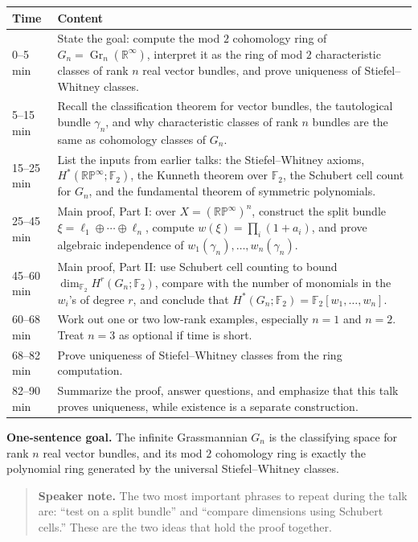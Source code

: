 \documentclass[11pt]{article}
\theoremstyle{remark}
\newcommand{\F}{\mathbb F}
\newcommand{\R}{\mathbb R}
\newcommand{\RP}{\mathbb{RP}}
\newcommand{\Gr}{\operatorname{Gr}}
\newcommand{\Gn}{G_n}
\newcommand{\gamman}{\gamma_n}
\newenvironment{talknote}{\begin{quote}\small\textbf{Speaker note.} }{\end{quote}}
\begin{document}
\begin{longtable}{@{}p{}p{}@{}}
\toprule
Time & Content \\
\midrule
0--5 min & State the goal: compute the mod $2$ cohomology ring of $\Gn=\Gr_n(\R^\infty)$, interpret it as the ring of mod $2$ characteristic classes of rank $n$ real vector bundles, and prove uniqueness of Stiefel--Whitney classes. \\
5--15 min & Recall the classification theorem for vector bundles, the tautological bundle $\gamman$, and why characteristic classes of rank $n$ bundles are the same as cohomology classes of $\Gn$. \\
15--25 min & List the inputs from earlier talks: the Stiefel--Whitney axioms, $H^*(\RP^\infty;\F_2)$, the Kunneth theorem over $\F_2$, the Schubert cell count for $\Gn$, and the fundamental theorem of symmetric polynomials. \\
25--45 min & Main proof, Part I: over $X=(\RP^\infty)^n$, construct the split bundle $\xi=\ell_1\oplus\cdots\oplus\ell_n$, compute $w(\xi)=\prod_i(1+a_i)$, and prove algebraic independence of $w_1(\gamman),\dots,w_n(\gamman)$. \\
45--60 min & Main proof, Part II: use Schubert cell counting to bound $\dim_{\F_2}H^r(\Gn;\F_2)$, compare with the number of monomials in the $w_i$'s of degree $r$, and conclude that $H^*(\Gn;\F_2)=\F_2[w_1,\dots,w_n]$. \\
60--68 min & Work out one or two low-rank examples, especially $n=1$ and $n=2$.  Treat $n=3$ as optional if time is short. \\
68--82 min & Prove uniqueness of Stiefel--Whitney classes from the ring computation. \\
82--90 min & Summarize the proof, answer questions, and emphasize that this talk proves uniqueness, while existence is a separate construction. \\
\bottomrule
\end{longtable}

\textbf{One-sentence goal.}  The infinite Grassmannian $\Gn$ is the classifying space for rank $n$ real vector bundles, and its mod $2$ cohomology ring is exactly the polynomial ring generated by the universal Stiefel--Whitney classes.

\begin{talknote}
The two most important phrases to repeat during the talk are: ``test on a split bundle'' and ``compare dimensions using Schubert cells.''  These are the two ideas that hold the proof together.
\end{talknote}
\end{document}
